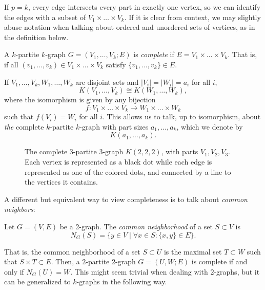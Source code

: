 \begin{remark}\label{rem:ordered}
    If $p=k$, every edge intersects every part in exactly one vertex,
    so we can identify the edges with a subset of $ V_1 \times \dots \times V_k$.
    If it is clear from context, we may slightly abuse notation when talking about ordered and
    unordered sets of vertices, as in the definition below.
\end{remark}

\begin{definition}
    A $k$-partite $k$-graph $G = (V_1, \dots, V_k; E)$ is \emph{complete}
    if $E = V_1 \times \dots \times V_k$.
    That is, if all $(v_1, \dots, v_k) \in V_1 \times \dots \times V_k$
    satisfy $\{v_1, \dots, v_k\} \in E$.
\end{definition}

\begin{remark}
    If $V_1, \dots, V_k, W_1, \dots, W_k$ are disjoint sets
    and $|V_i| = |W_i| = a_i$ for all $i$,
    \[
        K(V_1, \dots, V_k) \cong K(W_1, \dots, W_k),
    \]
    where the isomorphism is given by any bijection
    \[
        f: V_1 \times \dots \times V_k \to W_1 \times \dots \times W_k
    \]
    such that $f(V_i) = W_i$ for all $i$.
    This allows us to talk, up to isomorphism, about \emph{the} complete $k$-partite $k$-graph
    with part sizes $a_1, \dots, a_k$, which we denote by
    \[
        K(a_1, \dots, a_k).
    \]

\end{remark}

\begin{figure}[htbp]
    \centering
    
    \caption{The complete 3-partite 3-graph $K(2, 2, 2)$, with parts $V_1, V_2, V_3$.
    Each vertex is represented as a black dot while
    each edge is represented as one of the colored dots, and connected by a line to the vertices it contains.}
    \label{fig:222}
\end{figure}

A different but equivalent way to view completeness is to talk about \emph{common neighbors}:
\begin{definition}
    Let $G = (V, E)$ be a 2-graph.
    The \emph{common neighborhood} of a set $S \subset V$ is
    \[
        N_G(S) = \{y \in V \mid \forall x \in S: \{x, y\} \in E\}.
    \]
\end{definition}

That is, the common neighborhood of a set $S \subset U$ is the maximal set $T \subset W$ such that
$S \times T \subset E$.
Then, a $2$-partite 2-graph $G = (U, W; E)$ is complete if and only if $N_G(U) = W$.
This might seem trivial when dealing with $2$-graphs, but it can be generalized to $k$-graphs
in the following way.

